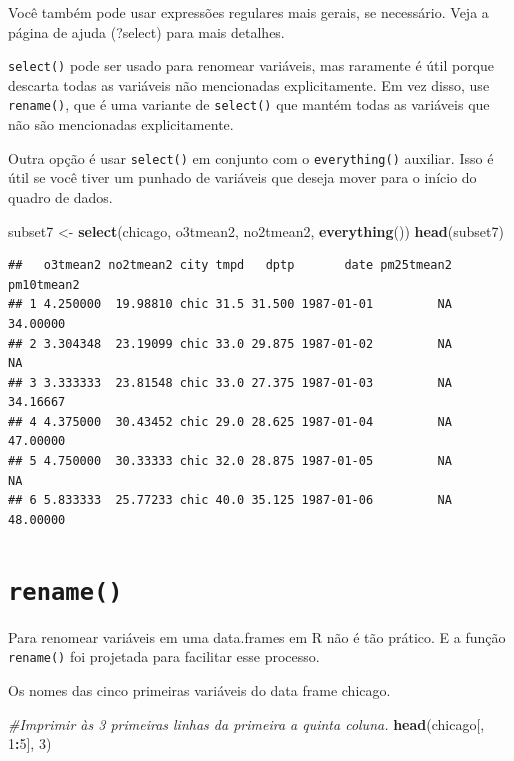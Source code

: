 \documentclass[]{book}
\newenvironment{Shaded}{\begin{snugshade}}{\end{snugshade}}
\newcommand{\CommentTok}[1]{\textcolor[rgb]{0.56,0.35,0.01}{\textit{#1}}}
\newcommand{\DecValTok}[1]{\textcolor[rgb]{0.00,0.00,0.81}{#1}}
\newcommand{\KeywordTok}[1]{\textcolor[rgb]{0.13,0.29,0.53}{\textbf{#1}}}
\newcommand{\NormalTok}[1]{#1}
\newcommand{\OperatorTok}[1]{\textcolor[rgb]{0.81,0.36,0.00}{\textbf{#1}}}
\newcommand{\StringTok}[1]{\textcolor[rgb]{0.31,0.60,0.02}{#1}}
\begin{document}
Você também pode usar expressões regulares mais gerais, se necessário. Veja a página de ajuda (?select) para mais detalhes.

\texttt{select()} pode ser usado para renomear variáveis, mas raramente é útil porque descarta todas as variáveis não mencionadas explicitamente. Em vez disso, use \texttt{rename()}, que é uma variante de \texttt{select()} que mantém todas as variáveis que não são mencionadas explicitamente.

Outra opção é usar \texttt{select()} em conjunto com o \texttt{everything()} auxiliar. Isso é útil se você tiver um punhado de variáveis que deseja mover para o início do quadro de dados.

\begin{Shaded}
\begin{Highlighting}[]
\NormalTok{subset7 <-}\StringTok{ }\KeywordTok{select}\NormalTok{(chicago, o3tmean2, no2tmean2, }\KeywordTok{everything}\NormalTok{())}
\KeywordTok{head}\NormalTok{(subset7)}
\end{Highlighting}
\end{Shaded}

\begin{verbatim}
##   o3tmean2 no2tmean2 city tmpd   dptp       date pm25tmean2 pm10tmean2
## 1 4.250000  19.98810 chic 31.5 31.500 1987-01-01         NA   34.00000
## 2 3.304348  23.19099 chic 33.0 29.875 1987-01-02         NA         NA
## 3 3.333333  23.81548 chic 33.0 27.375 1987-01-03         NA   34.16667
## 4 4.375000  30.43452 chic 29.0 28.625 1987-01-04         NA   47.00000
## 5 4.750000  30.33333 chic 32.0 28.875 1987-01-05         NA         NA
## 6 5.833333  25.77233 chic 40.0 35.125 1987-01-06         NA   48.00000
\end{verbatim}

\hypertarget{rename}{%
\section{\texorpdfstring{\texttt{rename()}}{rename()}}\label{rename}}

Para renomear variáveis em uma data.frames em R não é tão prático. E a função \texttt{rename()} foi projetada para facilitar esse processo.

Os nomes das cinco primeiras variáveis do data frame chicago.

\begin{Shaded}
\begin{Highlighting}[]
\CommentTok{#Imprimir às 3 primeiras linhas da primeira a quinta coluna.}
\KeywordTok{head}\NormalTok{(chicago[, }\DecValTok{1}\OperatorTok{:}\DecValTok{5}\NormalTok{], }\DecValTok{3}\NormalTok{)}
\end{Highlighting}
\end{Shaded}
\end{document}
